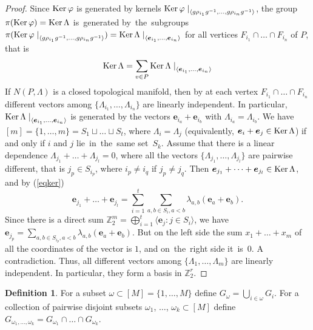 \documentclass[12pt]{amsart}
\theoremstyle{definition}
\newtheorem{definition}[formula]{Definition}
\theoremstyle{remark}
\begin{document}
\begin{proof}
Since ${{\rm Ker\,} \varphi}$ is generated by 
kernels ${\rm Ker}\,\varphi\left.\right|_{\langle g\rho_{i_1}g^{-1},\dots, g\rho_{i_n}g^{-1}\rangle}$, the group
$\pi({{\rm Ker\,} \varphi})={\rm Ker}\,\Lambda$ is~generated by~the~subgroups $\pi({\rm Ker}\,\varphi\left.\right|_{\langle g\rho_{i_1}g^{-1},\dots, g\rho_{i_n}g^{-1}\rangle})={\rm Ker}\,\Lambda\left.\right|_{\langle \boldsymbol{e}_{i_1},\dots, \boldsymbol{e}_{i_n}\rangle}$
for all vertices $F_{i_1}\cap\dots\cap F_{i_n}$ of $P$,
that is
\begin{equation}\label{eqker}
{\rm Ker}\,\Lambda=\sum\limits_{v\in P}{\rm Ker}\,\Lambda\left.\right|_{\langle \boldsymbol{e}_{i_1},\dots, \boldsymbol{e}_{i_n}\rangle}
\end{equation}
If $N(P,\Lambda)$ is a closed topological manifold, then by \cite[Theorem 5.1]{E24} at each vertex $F_{i_1}\cap\dots\cap F_{i_n}$
different vectors among $\{\Lambda_{i_1},\dots, \Lambda_{i_n}\}$ are linearly independent. In particular, 
${\rm Ker}\,\Lambda\left.\right|_{\langle \boldsymbol{e}_{i_1},\dots, \boldsymbol{e}_{i_n}\rangle}$ is generated 
by the vectors $\boldsymbol{e}_{i_a}+ \boldsymbol{e}_{i_b}$ with $\Lambda_{i_a}=\Lambda_{i_b}$.
We have  $[m]=\{1,\dots,m\}=S_1\sqcup\dots\sqcup S_t$, where 
$\Lambda_i=\Lambda_j$ (equivalently, $\boldsymbol{e}_i+ \boldsymbol{e}_j\in {\rm Ker}\,\Lambda$) 
if and only if $i$ and $j$ lie~in~the~same set~$S_k$. 
Assume that there is a linear dependence $\Lambda_{j_1}+\dots+\Lambda_{j_l}=0$, where all the vectors 
$\{\Lambda_{j_1},\dots, \Lambda_{j_l}\}$ are pairwise different, that is $j_p\in S_{i_p}$, where $i_p\ne i_q$ if $j_p\ne j_q$. 
Then $\boldsymbol{e}_{j_1}+\dots+ \boldsymbol{e}_{j_l}\in {\rm Ker}\,\Lambda$, and by (\ref{eqker})
$$
\boldsymbol{e}_{j_1}+\dots +\boldsymbol{e}_{j_l}=\sum\limits_{i=1}^t\sum\limits_{a,b\in S_i, a<b}\lambda_{a,b}(\boldsymbol{e}_a+\boldsymbol{e}_b).
$$
Since there is a direct sum $\mathbb Z_2^m=\bigoplus\limits_{i=1}^t\langle \boldsymbol{e}_j\colon j\in S_i\rangle$,
we have $\boldsymbol{e}_{j_p}=\sum\limits_{a,b\in S_{i_p}, a<b}\lambda_{a,b}(\boldsymbol{e}_a+\boldsymbol{e}_b)$. 
But on the left side the sum $x_1+\dots+x_m$ of all the coordinates of the vector is $1$, and on~the~right side it~is~$0$.
A contradiction. Thus, all different vectors among $\{\Lambda_1,\dots, \Lambda_m\}$ are linearly independent.
In particular, they form a basis in $\mathbb Z_2^r$.
\end{proof}
\begin{definition}
For a subset $\omega\subset [M]=\{1,\dots, M\}$ define  $G_{\omega}=\bigcup\limits_{i\in\omega} G_i$.
For a collection of pairwise disjoint subsets $\omega_1$, $\dots$, $\omega_k\subset[M]$ define 
$G_{\omega_1,\dots,\omega_k}=G_{\omega_1}\cap\dots\cap G_{\omega_k}$.
\end{definition}
\end{document}
